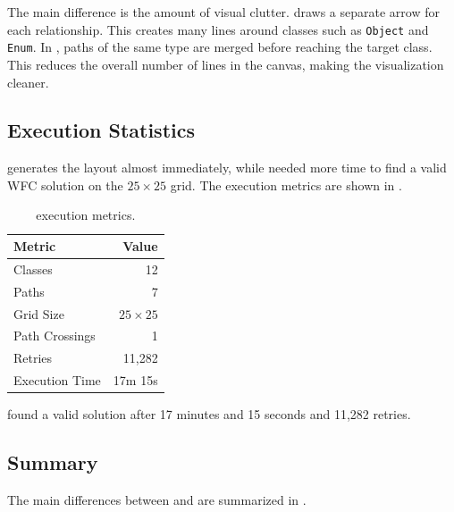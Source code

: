 \documentclass[../../main.tex]{subfiles}
\begin{document}
The main difference is the amount of visual clutter. \plantuml draws a separate arrow for each relationship. This creates many lines around classes such as \texttt{Object} and \texttt{Enum}. In \wassis, paths of the same type are merged before reaching the target class. This reduces the overall number of lines in the canvas, making the visualization cleaner.

\subsection{Execution Statistics}
\plantuml generates the layout almost immediately, while \wassis needed more time to find a valid WFC solution on the $25 \times 25$ grid. The execution metrics are shown in .

\begin{table}[ht]
    \centering
    \begin{tabular}{lr}
        \textbf{Metric} & \textbf{Value} \\ \hline
        Classes & 12 \\
        Paths & 7 \\
        Grid Size & $25 \times 25$ \\
        Path Crossings & 1 \\
        Retries & 11,282 \\
        Execution Time & 17m 15s \\ \hline
    \end{tabular}
    \caption{\wassis execution metrics.}
    \label{tab:wassis_multi_rel_stats}
\end{table}

\wassis found a valid solution after 17 minutes and 15 seconds and 11,282 retries.

\subsection{Summary}
The main differences between \wassis and \plantuml are summarized in .
\end{document}
